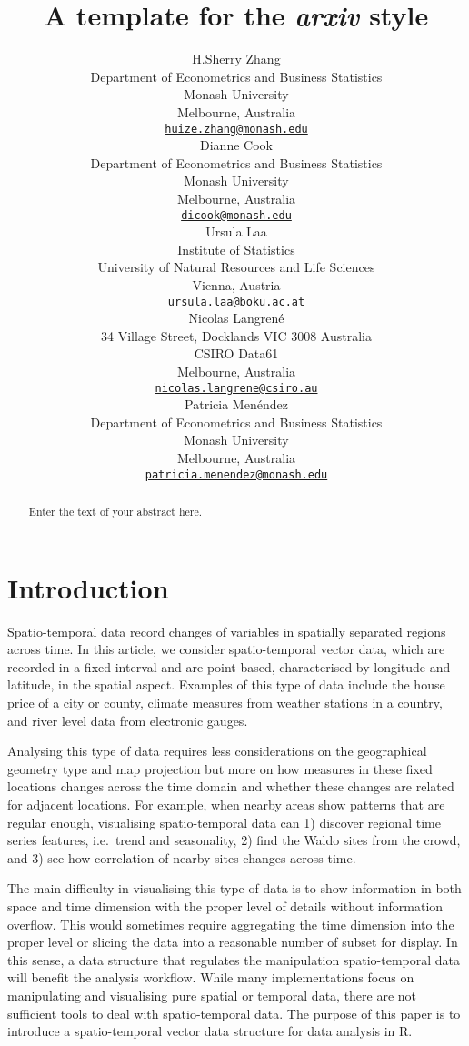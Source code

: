 \documentclass{article}
\title{A template for the \emph{arxiv} style}
\author{
    H.Sherry Zhang
   \\
    Department of Econometrics and Business Statistics \\
    Monash University \\
  Melbourne, Australia \\
  \texttt{\href{mailto:huize.zhang@monash.edu}{\nolinkurl{huize.zhang@monash.edu}}} \\
   \And
    Dianne Cook
   \\
    Department of Econometrics and Business Statistics \\
    Monash University \\
  Melbourne, Australia \\
  \texttt{\href{mailto:dicook@monash.edu}{\nolinkurl{dicook@monash.edu}}} \\
   \And
    Ursula Laa
   \\
    Institute of Statistics \\
    University of Natural Resources and Life Sciences \\
  Vienna, Austria \\
  \texttt{\href{mailto:ursula.laa@boku.ac.at}{\nolinkurl{ursula.laa@boku.ac.at}}} \\
   \And
    Nicolas Langrené
   \\
    34 Village Street, Docklands VIC 3008 Australia \\
    CSIRO Data61 \\
  Melbourne, Australia \\
  \texttt{\href{mailto:nicolas.langrene@csiro.au}{\nolinkurl{nicolas.langrene@csiro.au}}} \\
   \And
    Patricia Menéndez
   \\
    Department of Econometrics and Business Statistics \\
    Monash University \\
  Melbourne, Australia \\
  \texttt{\href{mailto:patricia.menendez@monash.edu}{\nolinkurl{patricia.menendez@monash.edu}}} \\
  }
\begin{document}
\maketitle

\def\tightlist{}


\begin{abstract}
Enter the text of your abstract here.
\end{abstract}


\newpage

\hypertarget{introduction}{%
\section{Introduction}\label{introduction}}

Spatio-temporal data record changes of variables in spatially separated
regions across time. In this article, we consider spatio-temporal vector
data, which are recorded in a fixed interval and are point based,
characterised by longitude and latitude, in the spatial aspect. Examples
of this type of data include the house price of a city or county,
climate measures from weather stations in a country, and river level
data from electronic gauges.

Analysing this type of data requires less considerations on the
geographical geometry type and map projection but more on how measures
in these fixed locations changes across the time domain and whether
these changes are related for adjacent locations. For example, when
nearby areas show patterns that are regular enough, visualising
spatio-temporal data can 1) discover regional time series features,
i.e.~trend and seasonality, 2) find the Waldo sites from the crowd, and
3) see how correlation of nearby sites changes across time.

The main difficulty in visualising this type of data is to show
information in both space and time dimension with the proper level of
details without information overflow. This would sometimes require
aggregating the time dimension into the proper level or slicing the data
into a reasonable number of subset for display. In this sense, a data
structure that regulates the manipulation spatio-temporal data will
benefit the analysis workflow. While many implementations focus on
manipulating and visualising pure spatial or temporal data, there are
not sufficient tools to deal with spatio-temporal data. The purpose of
this paper is to introduce a spatio-temporal vector data structure for
data analysis in R.
\end{document}
